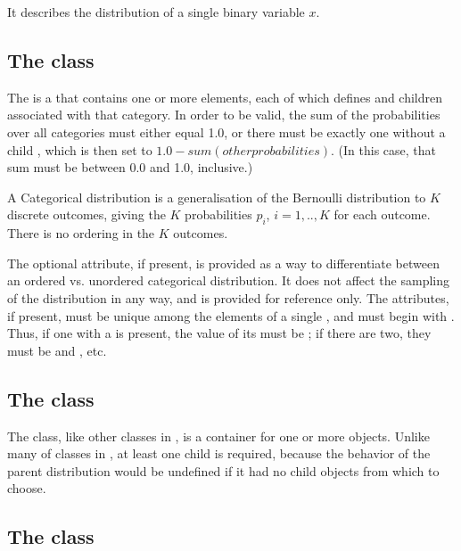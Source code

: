 It describes the distribution of a single binary variable $ x $.

\subsection{The  class}
\label{CategoricalDistribution-class}
\label{categoricaldistribution-class}

The \CategoricalDistribution is a \CategoricalUnivariateDistribution that contains one or more \Category elements, each of which defines \UncertValue {} and  children associated with that category.  In order to be valid, the sum of the probabilities over all categories must either equal 1.0, or there must be exactly one \Category without a child \UncertValue {}, which is then set to $ 1.0 - sum(other probabilities)$.  (In this case, that sum must be between 0.0 and 1.0, inclusive.)

A Categorical distribution is a generalisation of the Bernoulli distribution to $ K $ discrete outcomes, giving the $ K $ probabilities $ p_i $, $ i=1,..,K $ for each outcome. There is no ordering in the $ K $ outcomes.

The optional  attribute, if present, is provided as a way to differentiate between an ordered vs. unordered categorical distribution.  It does not affect the sampling of the distribution in any way, and is provided for reference only.  The  attributes, if present, must be unique among the \Category elements of a single \CategoricalDistribution, and must begin with .  Thus, if one \Category with a  is present, the value of its  must be ; if there are two, they must be  and , etc.


\subsection{The  class}
\label{ListOfCategories-class}
\label{listofcategories-class}

The \ListOfCategories class, like other \ListOf classes in \sbmlthreecore, is a container for one or more \Category objects.  Unlike many of \ListOf classes in \sbmlthreecore, at least one child \Category is required, because the behavior of the parent distribution would be undefined if it had no child \Category objects from which to choose.


\subsection{The  class}
\label{Category-class}
\label{category-class}


